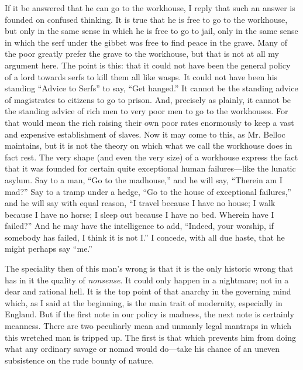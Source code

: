 \documentclass{book}
\begin{document}
If it be answered that he can go to the workhouse, I reply that such an answer is founded on confused thinking. It is true that he is free to go to the workhouse, but only in the same sense in which he is free to go to jail, only in the same sense in which the serf under the gibbet was free to find peace in the grave. Many of the poor greatly prefer the grave to the workhouse, but that is not at all my argument here. The point is this: that it could not have been the general policy of a lord towards serfs to kill them all like wasps. It could not have been his standing “Advice to Serfs” to say, “Get hanged.” It cannot be the standing advice of magistrates to citizens to go to prison. And, precisely as plainly, it cannot be the standing advice of rich men to very poor men to go to the workhouses. For that would mean the rich raising their own poor rates enormously to keep a vast and expensive establishment of slaves. Now it may come to this, as Mr. Belloc maintains, but it is not the theory on which what we call the workhouse does in fact rest. The very shape (and even the very size) of a workhouse express the fact that it was founded for certain quite exceptional human failures—like the lunatic asylum. Say to a man, “Go to the madhouse,” and he will say, “Therein am I mad?” Say to a tramp under a hedge, “Go to the house of exceptional failures,” and he will say with equal reason, “I travel because I have no house; I walk because I have no horse; I sleep out because I have no bed. Wherein have I failed?” And he may have the intelligence to add, “Indeed, your worship, if somebody has failed, I think it is not I.” I concede, with all due haste, that he might perhaps say “me.”

The speciality then of this man’s wrong is that it is the only historic wrong that has in it the quality of \emph{nonsense}. It could only happen in a nightmare; not in a dear and rational hell. It is the top point of that anarchy in the governing mind which, as I said at the beginning, is the main trait of modernity, especially in England. But if the first note in our policy is madness, the next note is certainly meanness. There are two peculiarly mean and unmanly legal mantraps in which this wretched man is tripped up. The first is that which prevents him from doing what any ordinary savage or nomad would do—take his chance of an uneven subsistence on the rude bounty of nature.
\end{document}
